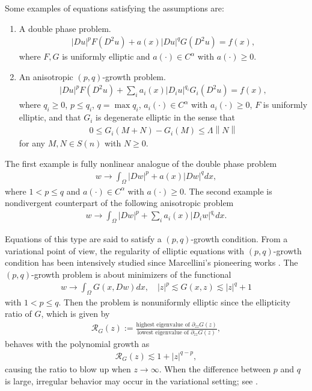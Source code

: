 \documentclass[reqno]{amsart}
\theoremstyle{plain}
\theoremstyle{definition}
\theoremstyle{remark}
\newcommand{\norm}[1]{\left\lVert#1\right\rVert}
\numberwithin{equation}{section}
\begin{document}
Some examples of equations satisfying the assumptions are:
\begin{enumerate}
    \item A double phase problem. 
    \begin{align} \label{dp}
        |Du|^p F(D^2u) + a(x)|Du|^q G(D^2u)= f(x),
    \end{align}
    where $F,G$ is uniformly elliptic and $a(\cdot) \in C^\alpha$ with $a(\cdot)\geq0$.
    \item An anisotropic $(p,q)$-growth problem. 
    \begin{align} \label{pq}
      |Du|^p F(D^2u) + \sum_i a_i(x)|D_iu|^{q_i} G_i(D^2u) =f(x),
    \end{align}
    where $q_i\geq 0$, $p\leq q_i$, $q=\max q_i$, $a_i(\cdot) \in C^\alpha$ with $a_i(\cdot)\geq0$, $F$ is uniformly elliptic, and that $G_i$ is degenerate elliptic in the sense that
    \begin{align*}
        0\leq G_i(M+N)-G_i(M) \leq \Lambda\norm{N}
    \end{align*}
    for any $M,N \in S(n)$ with $N\geq 0 $.
\end{enumerate}
The first example is fully nonlinear analogue of the double phase problem
\begin{align} \label{dpc}
    w\rightarrow \int_\Omega |Dw|^p + a(x)|Dw|^q dx,
\end{align}
where $1<p\leq q$ and $a(\cdot) \in C^\alpha$ with $a(\cdot)\geq0$.
The second example is nondivergent counterpart of the following anisotropic problem
\begin{align}
    w\rightarrow \int_\Omega |Dw|^p + \sum _{i} a_i(x)|D_iw|^{q_i} dx.
\end{align}

Equations of this type are said to satisfy a $(p,q)$-growth condition.
From a variational point of view, the regularity of elliptic equations with $(p,q)$-growth condition has been intensively studied since Marcellini's pioneering works \cite{Marcellini89, Marcellini91}. The $(p,q)$-growth problem is about minimizers of the functional
\begin{align} \label{pqproblem}
     w\rightarrow \int_\Omega G(x,Dw) dx, \quad |z|^p \lesssim G(x,z) \lesssim |z|^q+1
\end{align}
with $1<p\le q$.
Then the problem is nonuniformly elliptic since the ellipticity ratio of $G$, which is given by
\begin{align*}
    \mathcal{R}_G(z) := \frac{\text{highest eigenvalue of } \partial_{zz}G(z)}{\text{lowest eigenvalue of } \partial_{zz}G(z)},
\end{align*}
behaves with the polynomial growth as
\begin{align*}
    \mathcal{R}_G(z) \lesssim 1+|z|^{q-p},
\end{align*}
causing the ratio to blow up when $z \rightarrow \infty$.
When the difference between $p$ and $q$ is large, irregular behavior
may occur in the variational setting; see \cite{Giaquinta87,Marcellini91}.
\end{document}
